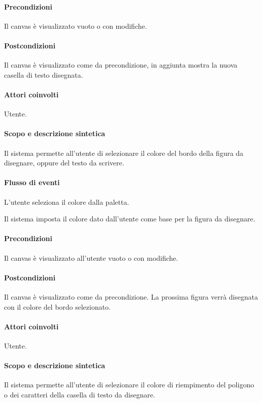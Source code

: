 \paragraph{Precondizioni} Il canvas \`e visualizzato vuoto o con modifiche.
\paragraph{Postcondizioni} Il canvas \`e visualizzato come da precondizione, in aggiunta mostra la nuova casella di testo disegnata.

\paragraph{Attori coinvolti} Utente.
\paragraph{Scopo e descrizione sintetica} 
Il sistema permette all'utente di selezionare il colore del bordo della figura da disegnare, oppure del testo da scrivere.
\paragraph{Flusso di eventi}
\begin{elenconumerato}[\textbf{}]{\subsubsecindent}
\item L'utente seleziona il colore dalla paletta.
\item Il sistema imposta il colore dato dall'utente come base per la figura da disegnare.
\end{elenconumerato}
\paragraph{Precondizioni} Il canvas \`e visualizzato all'utente vuoto o con modifiche.
\paragraph{Postcondizioni} Il canvas \`e visualizzato come da precondizione. La prossima figura verr\` a disegnata con il colore del bordo selezionato.

\paragraph{Attori coinvolti} Utente.
\paragraph{Scopo e descrizione sintetica} 
Il sistema permette all'utente di selezionare il colore di riempimento del poligono o dei caratteri della casella di testo da disegnare.

